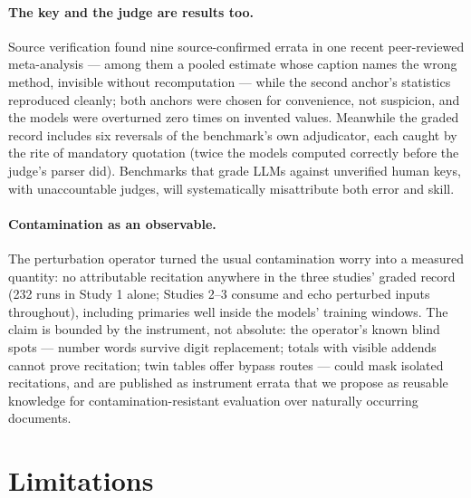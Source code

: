 \documentclass[11pt]{article}
\begin{document}
\paragraph{The key and the judge are results too.} Source verification found nine source-confirmed errata in one recent peer-reviewed meta-analysis --- among them a pooled estimate whose caption names the wrong method, invisible without recomputation --- while the second anchor's statistics reproduced cleanly; both anchors were chosen for convenience, not suspicion, and the models were overturned zero times on invented values. Meanwhile the graded record includes six reversals of the benchmark's own adjudicator, each caught by the rite of mandatory quotation (twice the models computed correctly before the judge's parser did). Benchmarks that grade LLMs against unverified human keys, with unaccountable judges, will systematically misattribute both error and skill.

\paragraph{Contamination as an observable.} The perturbation operator turned the usual contamination worry \citep{xu2024contamination} into a measured quantity: no attributable recitation anywhere in the three studies' graded record (232 runs in Study 1 alone; Studies 2--3 consume and echo perturbed inputs throughout), including primaries well inside the models' training windows. The claim is bounded by the instrument, not absolute: the operator's known blind spots --- number words survive digit replacement; totals with visible addends cannot prove recitation; twin tables offer bypass routes --- could mask isolated recitations, and are published as instrument errata that we propose as reusable knowledge for contamination-resistant evaluation over naturally occurring documents.

\section{Limitations}
\end{document}
